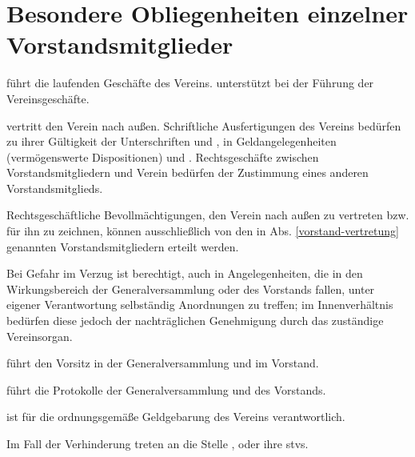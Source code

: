 \documentclass{article}
\begin{document}
\section{Besondere Obliegenheiten einzelner Vorstandsmitglieder}\label{vorstand-besonders}
\begin{absatz}
    \item {} führt die laufenden Geschäfte des Vereins.  unterstützt  bei der Führung der Vereinsgeschäfte.
    \item \label{vorstand-vertretung}  vertritt den Verein nach außen. Schriftliche Ausfertigungen des Vereins bedürfen zu ihrer Gültigkeit der Unterschriften  und , in Geldangelegenheiten (vermögenswerte Dispositionen)  und . Rechtsgeschäfte zwischen Vorstandsmitgliedern und Verein bedürfen der Zustimmung eines anderen Vorstandsmitglieds.
    \item Rechtsgeschäftliche Bevollmächtigungen, den Verein nach außen zu vertreten bzw. für ihn zu zeichnen, können ausschließlich von den in Abs. \ref{vorstand-vertretung} genannten Vorstandsmitgliedern erteilt werden.
    \item Bei Gefahr im Verzug ist  berechtigt, auch in Angelegenheiten, die in den Wirkungsbereich der Generalversammlung oder des Vorstands fallen, unter eigener Verantwortung selbständig Anordnungen zu treffen; im Innenverhältnis bedürfen diese jedoch der nachträglichen Genehmigung durch das zuständige Vereinsorgan.
    \item {} führt den Vorsitz in der Generalversammlung und im Vorstand.
    \item {} führt die Protokolle der Generalversammlung und des Vorstands.
    \item {} ist für die ordnungsgemäße Geldgebarung des Vereins verantwortlich.
    \item Im Fall der Verhinderung treten an die Stelle ,  oder  ihre \glspl{stv}.
\end{absatz}
\end{document}
